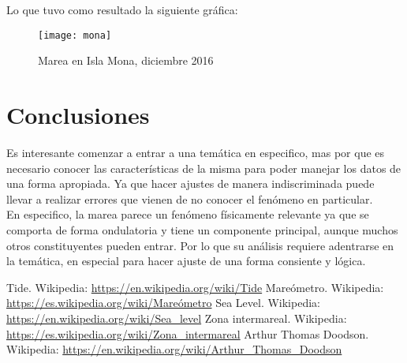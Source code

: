 \documentclass[12pt,letterpaper]{article}
\begin{document}
Lo que tuvo como resultado la siguiente gráfica:

\begin{figure}[H]
	\centering	\texttt{[image: mona]}
	\caption{Marea en Isla Mona, diciembre 2016}
\end{figure}
\section{Conclusiones} 

Es interesante comenzar a entrar a una temática en especifico, mas por que es necesario conocer las características de la misma para poder manejar los datos de una forma apropiada. Ya que hacer ajustes de manera indiscriminada puede llevar a realizar errores que vienen de no conocer el fenómeno en particular.\\

En especifico, la marea parece un fenómeno físicamente relevante ya que se comporta de forma ondulatoria y tiene un componente principal, aunque muchos otros constituyentes pueden entrar. Por lo que su análisis requiere adentrarse en la temática, en especial para hacer ajuste de una forma consiente y lógica.\\
\begin{thebibliography}{2}

 Tide. Wikipedia: \url{https://en.wikipedia.org/wiki/Tide}
 Mareómetro. Wikipedia: \url{https://es.wikipedia.org/wiki/Mareómetro}
 Sea Level. Wikipedia: \url{https://en.wikipedia.org/wiki/Sea_level}
 Zona intermareal. Wikipedia: \url{https://es.wikipedia.org/wiki/Zona_intermareal}
 Arthur Thomas Doodson. Wikipedia: \url{https://en.wikipedia.org/wiki/Arthur_Thomas_Doodson}

\end{thebibliography}
\end{document}
